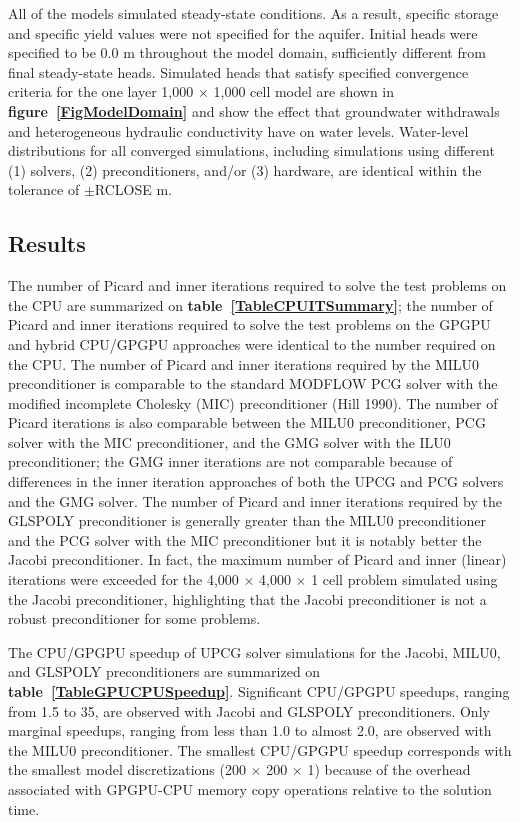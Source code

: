 \documentclass[12pt]{article}
\begin{document}
All of the models simulated steady-state conditions. As a result, specific storage and specific yield values were not specified for the aquifer. Initial heads were specified to be 0.0 m throughout the model domain, sufficiently different from final steady-state heads. Simulated heads \color{cyan} that satisfy specified convergence criteria \color{black} for the one layer 1,000 $\times$ 1,000 cell model are shown in \textbf{figure~\ref{FigModelDomain}} and show the effect that groundwater withdrawals and heterogeneous hydraulic conductivity have on water levels. \color{cyan}Water-level distributions for all converged simulations, including simulations using different (1) solvers, (2) preconditioners, and/or (3) hardware, are identical within the tolerance of $\pm$RCLOSE m.\color{black}

\subsection*{Results}
\color{blue}The number of Picard and inner iterations required to solve the test problems on the CPU are summarized on \textbf{table~\ref{TableCPUITSummary}}; the number of Picard and inner iterations required to solve the test problems on the GPGPU and hybrid CPU/GPGPU approaches were identical to the number required on the CPU. The number of Picard and inner iterations required by the MILU0 preconditioner is comparable to the standard MODFLOW PCG solver with the modified incomplete Cholesky (MIC) preconditioner (Hill 1990). The number of Picard iterations is also comparable between the MILU0 preconditioner, PCG solver with the MIC preconditioner, and the GMG solver with the ILU0 preconditioner; the GMG inner iterations are not comparable because of differences in the inner iteration approaches of both the UPCG and PCG solvers and the GMG solver. The number of Picard and inner iterations required by the GLSPOLY preconditioner is generally greater than the MILU0 preconditioner and the PCG solver with the MIC preconditioner but it is notably better the Jacobi preconditioner. In fact, the maximum number of Picard and inner (linear) iterations were exceeded for the 4,000 $\times$ 4,000 $\times$ 1 cell problem simulated using the Jacobi preconditioner, highlighting that the Jacobi preconditioner is not a robust preconditioner for some problems.\color{black}

The CPU/GPGPU speedup of UPCG solver simulations for the Jacobi, MILU0, and GLSPOLY preconditioners are summarized on \textbf{table~\ref{TableGPUCPUSpeedup}}. Significant  CPU/GPGPU speedups, ranging from 1.5 to 35, are observed with Jacobi and GLSPOLY preconditioners. Only marginal speedups, ranging from less than 1.0 to almost 2.0, are observed with the MILU0 preconditioner. The smallest CPU/GPGPU speedup corresponds with the smallest model discretizations (200 $\times$ 200 $\times$ 1) because of the overhead associated with GPGPU-CPU memory copy operations relative to the solution time. 
 
\end{document}
